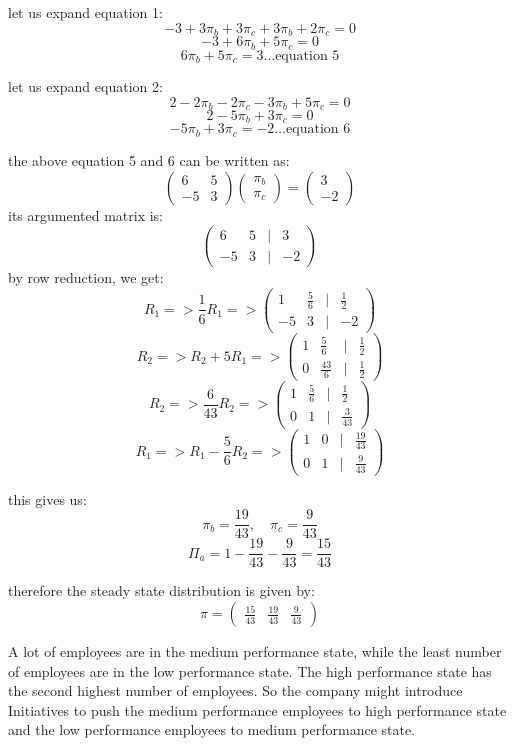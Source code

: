 \documentclass{article}
\begin{document}
let us expand equation 1:
\[-3 + 3\pi_b + 3\pi_c + 3\pi_b + 2\pi_c = 0\]
\[-3 + 6\pi_b + 5\pi_c = 0\]
\[6\pi_b + 5\pi_c = 3 \ldots\text{equation 5}\]

let us expand equation 2:
\[2 - 2\pi_b - 2\pi_c - 3\pi_b + 5\pi_c = 0\]
\[2 - 5\pi_b + 3\pi_c = 0\]
\[-5\pi_b + 3\pi_c = -2 \ldots\text{equation 6}\]

the above equation 5 and 6 can be written as:
\[\begin{pmatrix}6&5\\-5&3\end{pmatrix}\begin{pmatrix}\pi_b\\\pi_c\end{pmatrix} = \begin{pmatrix}3\\-2\end{pmatrix}\]
its argumented matrix is:
\[\begin{pmatrix}6&5&|&3\\-5&3&|&-2\end{pmatrix}\]
by row reduction, we get:
\[R_1 => \frac{1}{6}R_1 => \begin{pmatrix}1&\frac{5}{6}&|&\frac{1}{2}\\-5&3&|&-2\end{pmatrix}\]
\[R_2 => R_2 + 5R_1 => \begin{pmatrix}1&\frac{5}{6}&|&\frac{1}{2}\\0&\frac{43}{6}&|&\frac{1}{2}\end{pmatrix}\]
\[R_2 => \frac{6}{43}R_2 => \begin{pmatrix}1&\frac{5}{6}&|&\frac{1}{2}\\0&1&|&\frac{3}{43}\end{pmatrix}\]
\[R_1 => R_1 - \frac{5}{6}R_2 => \begin{pmatrix}1&0&|&\frac{19}{43}\\0&1&|&\frac{9}{43}\end{pmatrix}\]

this gives us:
\[\pi_b = \frac{19}{43}, \quad \pi_c = \frac{9}{43}\]
\[\Pi_a = 1 - \frac{19}{43} - \frac{9}{43} = \frac{15}{43}\]

therefore the steady state distribution is given by:
\[\pi = \begin{pmatrix}\frac{15}{43}&\frac{19}{43}&\frac{9}{43}\end{pmatrix}\]


A lot of employees are in the medium performance state, while the least number of employees are in the low performance state. The high performance state has the second highest number of employees. So the company might introduce Initiatives to push the medium performance employees to high performance state and the low performance employees to medium performance state.
\end{document}
